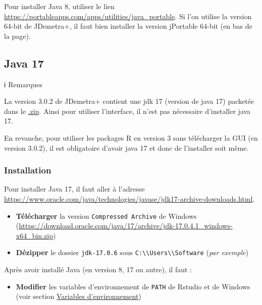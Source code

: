 \documentclass[
]{article}
\providecommand{\tightlist}{%
  \setlength{\itemsep}{0pt}\setlength{\parskip}{0pt}}
\begin{document}
Pour installer Java 8, utiliser le lien
\textcolor{html_color}{\url{https://portableapps.com/apps/utilities/java_portable}}.
Si l'on utilise la version 64-bit de JDemetra+, il faut bien installer
la version jPortable 64-bit (en bas de la page).

\hypertarget{java-17}{%
\subsection{Java 17}\label{java-17}}

ℹ️ Remarques

La version 3.0.2 de JDemetra+ contient une jdk 17 (version de java 17)
packetée dans le
\href{https://github.com/jdemetra/jdplus-main/releases/tag/v3.0.2}{.zip}.
Ainsi pour utiliser l'interface, il n'est pas nécessaire d'installer
java 17.

En revanche, pour utiliser les packages R en version 3 sans télécharger
la GUI (en version 3.0.2), il est obligatoire d'avoir java 17 et donc de
l'installer soit même.

\hypertarget{installation}{%
\subsubsection{Installation}\label{installation}}

Pour installer Java 17, il faut aller à l'adresse
\textcolor{html_color}{\url{https://www.oracle.com/java/technologies/javase/jdk17-archive-downloads.html}}.

\begin{itemize}
\tightlist
\item
  \textbf{Télécharger} la version \texttt{Compressed\ Archive} de
  Windows
  (\textcolor{html_color}{\url{https://download.oracle.com/java/17/archive/jdk-17.0.4.1_windows-x64_bin.zip}})
\item
  \textbf{Dézipper} le dossier
  \textcolor{windows_path_color}{\nolinkurl{jdk-17.0.6}} sous
  \textcolor{windows_path_color}{\nolinkurl{C:\\Users\\Software}}
  (\emph{par exemple})
\end{itemize}

Après avoir installé Java (en version 8, 17 ou autre), il faut :

\begin{itemize}
\tightlist
\item
  \textbf{Modifier} les variables d'environnement de \texttt{PATH} de
  Rstudio et de Windows (voir section
  \protect\hyperlink{var_env}{Variables d'environnement})
\end{itemize}
\end{document}
